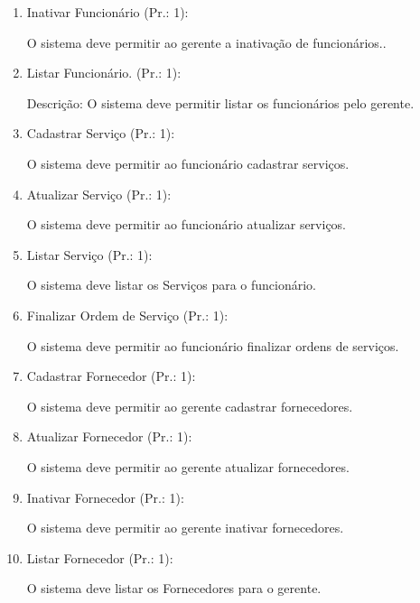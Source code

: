 \begin{enumerate}[
	label=RF\arabic{*}, 
	ref=(RF\arabic{*}),
	leftmargin=1.5em,
	itemindent=4.5em]
\item  Inativar Funcionário (Pr.: 1):\par
O sistema deve permitir ao gerente a inativação de funcionários..\par

\item Listar Funcionário. (Pr.: 1):\par
Descrição: O sistema deve permitir listar os funcionários pelo gerente.\par

\item Cadastrar Serviço (Pr.: 1):\par
O sistema deve permitir ao funcionário cadastrar serviços.\par

\item Atualizar Serviço (Pr.: 1):\par
O sistema deve permitir ao funcionário atualizar serviços.\par

\item Listar Serviço (Pr.: 1):\par
O sistema deve listar os Serviços para o funcionário.\par

\item Finalizar  Ordem de Serviço (Pr.: 1):\par
O sistema deve permitir ao funcionário finalizar ordens de serviços.\par

\item  Cadastrar Fornecedor (Pr.: 1):\par
O sistema deve permitir ao gerente cadastrar fornecedores.\par

\item Atualizar Fornecedor (Pr.: 1):\par
O sistema deve permitir ao gerente atualizar fornecedores.\par

\item Inativar Fornecedor (Pr.: 1):\par
O sistema deve permitir ao gerente inativar fornecedores.\par

\item Listar Fornecedor (Pr.: 1):\par
O sistema deve listar os Fornecedores para o gerente.\par


\end{enumerate}
